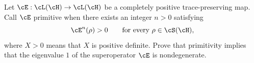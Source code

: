 Let $\cE:\cL(\cH)\to\cL(\cH)$ be a completely positive trace-preserving map. Call $\cE$ primitive when there exists an integer $n>0$ satisfying
$$
\cE^n(\rho)>0
\qquad
\text{for every }\rho\in\cS(\cH),
$$
where $X>0$ means that $X$ is positive definite. Prove that primitivity implies that the eigenvalue $1$ of the superoperator $\cE$ is nondegenerate.

